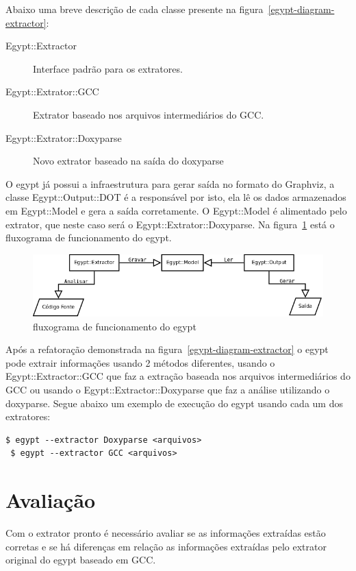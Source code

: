 Abaixo uma breve descrição de cada classe presente na
figura~\ref{egypt-diagram-extractor}:

\begin{description}
\item[Egypt::Extractor] Interface padrão para os extratores.
\item[Egypt::Extrator::GCC] Extrator baseado nos arquivos intermediários do GCC.
\item[Egypt::Extrator::Doxyparse] Novo extrator baseado na saída do doxyparse
\end{description}

O egypt já possui a infraestrutura para gerar saída no formato do Graphviz, a
classe Egypt::Output::DOT é a responsável por isto, ela lê os dados armazenados
em Egypt::Model e gera a saída corretamente. O Egypt::Model é alimentado pelo
extrator, que neste caso será o Egypt::Extrator::Doxyparse. Na
figura~\ref{egypt-fluxogram} está o fluxograma de funcionamento do egypt.

\begin{figure}[h]
\center
\includegraphics[scale=0.5]{imagens/egypt-fluxogram}
\caption{fluxograma de funcionamento do egypt}
\label{egypt-fluxogram}
\end{figure}

Após a refatoração demonstrada na figura~\ref{egypt-diagram-extractor} o egypt
pode extrair informações usando 2 métodos diferentes, usando o
Egypt::Extractor::GCC que faz a extração baseada nos arquivos intermediários do
GCC ou usando o Egypt::Extractor::Doxyparse que faz a análise utilizando o
doxyparse. Segue abaixo um exemplo de execução do egypt usando cada um dos
extratores:

\begin{Verbatim}[frame=single,fontsize=\relsize{-2},fontfamily=courier]
 $ egypt --extractor Doxyparse <arquivos>
 $ egypt --extractor GCC <arquivos>
\end{Verbatim}

\chapter{Avaliação}

Com o extrator pronto é necessário avaliar se as informações extraídas estão
corretas e se há diferenças em relação as informações extraídas pelo extrator
original do egypt baseado em GCC.

